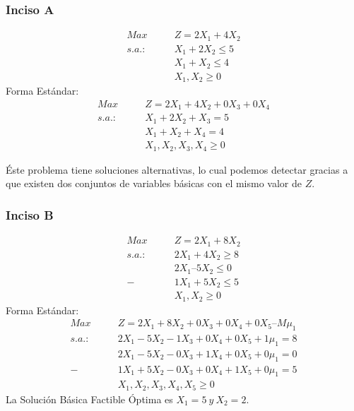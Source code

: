\documentclass{tarea}
\begin{document}
\begin{homeworkProblem}
\subsubsection{Inciso A}
\begin{align*}
	Max\ &Z = 2X_1 + 4X_2 \\
    s.a.:\quad\quad &X_1 + 2X_2 \le 5 \\
	&X_1 + X_2 \le 4 \\
	&X_1,X_2 \ge 0
\end{align*}
Forma Estándar:
\begin{align*}
	Max\ &Z = 2X_1 + 4X_2 + 0X_3 + 0X_4\\
    s.a.:\quad\quad &X_1 + 2X_2 + X_3 = 5 \\
	&X_1 + X_2 + X_4 =  4 \\
	&X_1,X_2,X_3,X_4 \ge 0
\end{align*}

Éste problema tiene soluciones alternativas, lo cual podemos detectar gracias a que existen dos conjuntos de variables básicas con el mismo valor de $Z$.



\subsubsection{Inciso B}
\begin{align*}
Max\ &Z = 2X_1 + 8X_2 \\
s.a. : \quad \quad &2X_1 + 4X_2 \ge 8 \\
&2X_1 – 5X_2 \le 0 \\
-&1X_1 + 5X_2 \le 5 \\
&X_1,X_2 \ge 0
\end{align*}
Forma Estándar:
\begin{align*}
Max\ &Z = 2X_1 + 8X_2 +0X_3 + 0X_4 + 0X_5  –  M\mu_1 \\
s.a. : \quad \quad &2X_1 - 5X_2 -1X_3 +0X_4 + 0X_5 + 1\mu_1= 8 \\
&2X_1 - 5X_2 -0X_3 +1X_4 +0X_5 + 0\mu_1 =0\\
-&1X_1 + 5X_2 -0X_3 +0X_4 + 1X_5 + 0\mu_1 = 5 \\
&X_1,X_2,X_3,X_4,X_5 \ge 0
\end{align*}
La Solución Básica Factible Óptima es $X_1 = 5\ y\ X_2=2$.



\end{homeworkProblem}
\end{document}
